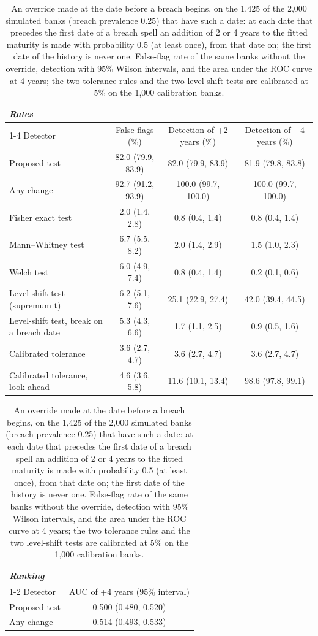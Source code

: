 \begin{table}[htbp]
\centering
\footnotesize
\caption{An override made at the date before a breach begins, on the 1,425 of the 2,000 simulated banks (breach prevalence 0.25) that have such a date: at each date that precedes the first date of a breach spell an addition of 2 or 4 years to the fitted maturity is made with probability 0.5 (at least once), from that date on; the first date of the history is never one. False-flag rate of the same banks without the override, detection with 95\% Wilson intervals, and the area under the ROC curve at 4 years; the two tolerance rules and the two level-shift tests are calibrated at 5\% on the 1,000 calibration banks.}
\label{tab:anticipation}
\begin{tabular}{p{4.6cm}ccc}
\toprule
\multicolumn{4}{l}{\textit{Rates}} \\
\cmidrule(lr){1-4}
Detector & False flags (\%) & Detection of +2 years (\%) & Detection of +4 years (\%) \\
\midrule
Proposed test & 82.0 (79.9, 83.9) & 82.0 (79.9, 83.9) & 81.9 (79.8, 83.8) \\
Any change & 92.7 (91.2, 93.9) & 100.0 (99.7, 100.0) & 100.0 (99.7, 100.0) \\
Fisher exact test & 2.0 (1.4, 2.8) & 0.8 (0.4, 1.4) & 0.8 (0.4, 1.4) \\
Mann--Whitney test & 6.7 (5.5, 8.2) & 2.0 (1.4, 2.9) & 1.5 (1.0, 2.3) \\
Welch test & 6.0 (4.9, 7.4) & 0.8 (0.4, 1.4) & 0.2 (0.1, 0.6) \\
Level-shift test (supremum t) & 6.2 (5.1, 7.6) & 25.1 (22.9, 27.4) & 42.0 (39.4, 44.5) \\
Level-shift test, break on a breach date & 5.3 (4.3, 6.6) & 1.7 (1.1, 2.5) & 0.9 (0.5, 1.6) \\
Calibrated tolerance & 3.6 (2.7, 4.7) & 3.6 (2.7, 4.7) & 3.6 (2.7, 4.7) \\
Calibrated tolerance, look-ahead & 4.6 (3.6, 5.8) & 11.6 (10.1, 13.4) & 98.6 (97.8, 99.1) \\
\bottomrule
\end{tabular}
\par\medskip
\begin{tabular}{p{4.6cm}c}
\toprule
\multicolumn{2}{l}{\textit{Ranking}} \\
\cmidrule(lr){1-2}
Detector & AUC of +4 years (95\% interval) \\
\midrule
Proposed test & 0.500 (0.480, 0.520) \\
Any change & 0.514 (0.493, 0.533) \\

\end{tabular}
\end{table}
